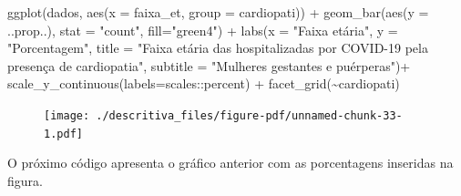 \documentclass[
  letterpaper,
  DIV=11,
  numbers=noendperiod]{scrreprt}
\newenvironment{Shaded}{\begin{snugshade}}{\end{snugshade}}
\newcommand{\AttributeTok}[1]{\textcolor[rgb]{0.40,0.45,0.13}{#1}}
\newcommand{\FunctionTok}[1]{\textcolor[rgb]{0.28,0.35,0.67}{#1}}
\newcommand{\NormalTok}[1]{\textcolor[rgb]{0.00,0.23,0.31}{#1}}
\newcommand{\SpecialCharTok}[1]{\textcolor[rgb]{0.37,0.37,0.37}{#1}}
\newcommand{\StringTok}[1]{\textcolor[rgb]{0.13,0.47,0.30}{#1}}
\begin{document}
\begin{Shaded}
\begin{Highlighting}[]
\FunctionTok{ggplot}\NormalTok{(dados, }\FunctionTok{aes}\NormalTok{(}\AttributeTok{x =}\NormalTok{ faixa\_et, }\AttributeTok{group =}\NormalTok{ cardiopati)) }\SpecialCharTok{+}  
  \FunctionTok{geom\_bar}\NormalTok{(}\FunctionTok{aes}\NormalTok{(}\AttributeTok{y =}\NormalTok{ ..prop..), }\AttributeTok{stat =} \StringTok{"count"}\NormalTok{, }\AttributeTok{fill=}\StringTok{"green4"}\NormalTok{) }\SpecialCharTok{+} 
  \FunctionTok{labs}\NormalTok{(}\AttributeTok{x =} \StringTok{"Faixa etária"}\NormalTok{, }\AttributeTok{y =} \StringTok{"Porcentagem"}\NormalTok{, }\AttributeTok{title =} \StringTok{"Faixa etária das hospitalizadas por COVID{-}19 pela presença de cardiopatia"}\NormalTok{, }\AttributeTok{subtitle =} \StringTok{"Mulheres gestantes e puérperas"}\NormalTok{)}\SpecialCharTok{+}
  \FunctionTok{scale\_y\_continuous}\NormalTok{(}\AttributeTok{labels=}\NormalTok{scales}\SpecialCharTok{::}\NormalTok{percent) }\SpecialCharTok{+}
  \FunctionTok{facet\_grid}\NormalTok{(}\SpecialCharTok{\textasciitilde{}}\NormalTok{cardiopati)}
\end{Highlighting}
\end{Shaded}

\begin{figure}[H]

{\centering \texttt{[image: ./descritiva\_files/figure-pdf/unnamed-chunk-33-1.pdf]}

}

\end{figure}

O próximo código apresenta o gráfico anterior com as porcentagens
inseridas na figura.
\end{document}
